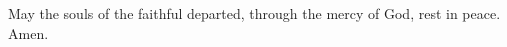 \rubric{\Vbar\ } May the souls of the faithful departed, through the mercy of God, rest in peace. \rubric{\Rbar\ } Amen.